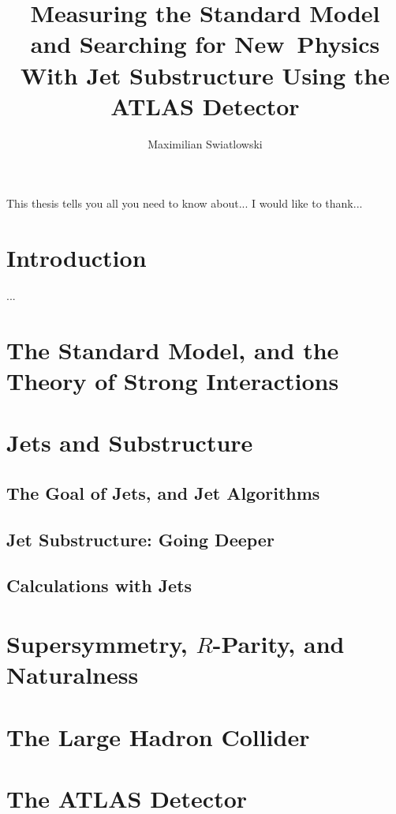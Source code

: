 \documentclass{report}
\begin{document}
\title{Measuring the Standard Model and Searching for New~Physics 
        With Jet Substructure Using the ATLAS Detector}
\author{Maximilian Swiatlowski}

 
\beforepreface
{}
    This thesis tells you all you need to know about...
    I would like to thank...
\afterpreface
 
\chapter{Introduction}
         ...

\chapter{The Standard Model, and the Theory of Strong Interactions}



\chapter{Jets and Substructure}
\label{chapter:jets-and-substructure}
\section{The Goal of Jets, and Jet Algorithms}
\section{Jet Substructure: Going Deeper}
\section{Calculations with Jets}


\chapter{Supersymmetry, $R$-Parity, and Naturalness}



\chapter{The Large Hadron Collider}

		

\chapter{The ATLAS Detector}

\end{document}
